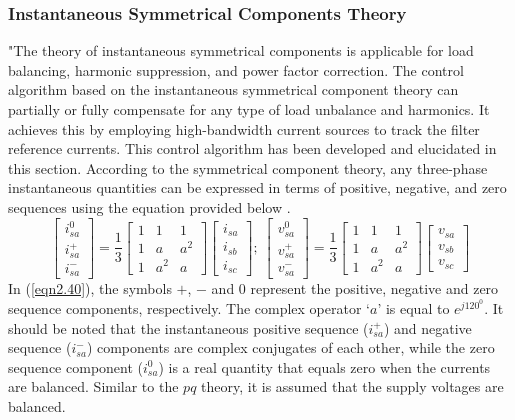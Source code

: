\subsubsection{Instantaneous Symmetrical Components Theory \cite{ghosh1998new,847283,ghosh2000use, Mahesh_Mishra}}
\vspace*{-.5cm}
"The theory of instantaneous symmetrical components is applicable for load balancing, harmonic suppression, and power factor correction. The control algorithm based on the instantaneous symmetrical component theory can partially or fully compensate for any type of load unbalance and harmonics. It achieves this by employing high-bandwidth current sources to track the filter reference currents. This control algorithm has been developed and elucidated in this section. According to the symmetrical component theory, any three-phase instantaneous quantities can be expressed in terms of positive, negative, and zero sequences using the equation provided below \cite{lyon1954transient}.
 \begin{equation}
\begin{bmatrix} i^0_{sa} \\  i^+_{sa} \\   i^-_{sa}
 \end{bmatrix}=  \frac{1}{3}\begin{bmatrix} 1 & 1 & 1 \\1 & a & a^2 \\ 1 & a^2 & a
\end{bmatrix} \begin{bmatrix}  i_{sa} \\ i_{sb} \\  i_{sc}
\end{bmatrix} ;\
 \begin{bmatrix} v^0_{sa} \\  v^+_{sa} \\   v^-_{sa}
 \end{bmatrix}=  \frac{1}{3}\begin{bmatrix} 1 & 1 & 1 \\1 & a & a^2 \\ 1 & a^2 & a
\end{bmatrix} \begin{bmatrix}  v_{sa} \\ v_{sb} \\  v_{sc}
\end{bmatrix}
\label{eqn2.40}
\end{equation}
In (\ref{eqn2.40}), the symbols $+$, $-$ and $0$ represent the positive, negative and zero sequence components, respectively. The complex operator `$a$' is equal to $e^{j120^0}$. It should be noted that the instantaneous positive sequence ($i^+_{sa}$) and negative sequence ($i^-_{sa}$) components are complex conjugates of each other, while the zero sequence component ($i^0_{sa}$) is a real quantity that equals zero when the currents are balanced. Similar to the $pq$ theory, it is assumed that the supply voltages are balanced. 

